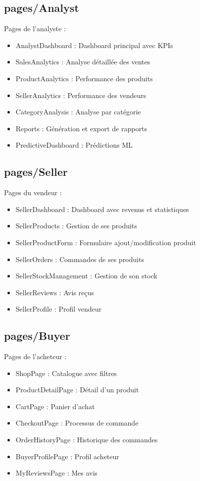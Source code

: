 \documentclass[12pt,a4paper]{report}
\begin{document}
\subsection{pages/Analyst}

Pages de l'analyste :
\begin{itemize}[noitemsep]
    \item AnalystDashboard : Dashboard principal avec KPIs
    \item SalesAnalytics : Analyse détaillée des ventes
    \item ProductAnalytics : Performance des produits
    \item SellerAnalytics : Performance des vendeurs
    \item CategoryAnalysis : Analyse par catégorie
    \item Reports : Génération et export de rapports
    \item PredictiveDashboard : Prédictions ML
\end{itemize}

\subsection{pages/Seller}

Pages du vendeur :
\begin{itemize}[noitemsep]
    \item SellerDashboard : Dashboard avec revenus et statistiques
    \item SellerProducts : Gestion de ses produits
    \item SellerProductForm : Formulaire ajout/modification produit
    \item SellerOrders : Commandes de ses produits
    \item SellerStockManagement : Gestion de son stock
    \item SellerReviews : Avis reçus
    \item SellerProfile : Profil vendeur
\end{itemize}

\subsection{pages/Buyer}

Pages de l'acheteur :
\begin{itemize}[noitemsep]
    \item ShopPage : Catalogue avec filtres
    \item ProductDetailPage : Détail d'un produit
    \item CartPage : Panier d'achat
    \item CheckoutPage : Processus de commande
    \item OrderHistoryPage : Historique des commandes
    \item BuyerProfilePage : Profil acheteur
    \item MyReviewsPage : Mes avis
\end{itemize}
\end{document}
